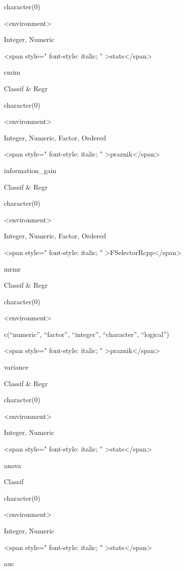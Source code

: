 \documentclass[12pt,]{scrbook}
\begin{document}
character(0)

\textless{}environment\textgreater{}

Integer, Numeric

\textless{}span style=" font-style: italic; " \textgreater{}stats\textless{}/span\textgreater{}

cmim

Classif \& Regr

character(0)

\textless{}environment\textgreater{}

Integer, Numeric, Factor, Ordered

\textless{}span style=" font-style: italic; " \textgreater{}praznik\textless{}/span\textgreater{}

information\_gain

Classif \& Regr

character(0)

\textless{}environment\textgreater{}

Integer, Numeric, Factor, Ordered

\textless{}span style=" font-style: italic; " \textgreater{}FSelectorRcpp\textless{}/span\textgreater{}

mrmr

Classif \& Regr

character(0)

\textless{}environment\textgreater{}

c(``numeric'', ``factor'', ``integer'', ``character'', ``logical'')

\textless{}span style=" font-style: italic; " \textgreater{}praznik\textless{}/span\textgreater{}

variance

Classif \& Regr

character(0)

\textless{}environment\textgreater{}

Integer, Numeric

\textless{}span style=" font-style: italic; " \textgreater{}stats\textless{}/span\textgreater{}

anova

Classif

character(0)

\textless{}environment\textgreater{}

Integer, Numeric

\textless{}span style=" font-style: italic; " \textgreater{}stats\textless{}/span\textgreater{}

auc
\end{document}
